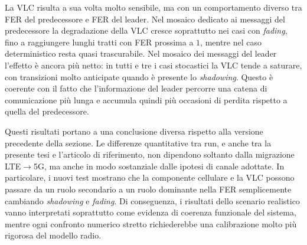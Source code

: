 La VLC risulta a sua volta molto sensibile, ma con un comportamento diverso tra FER del predecessore e FER del leader. Nel mosaico dedicato ai messaggi del predecessore la degradazione della VLC cresce soprattutto nei casi con \emph{fading}, fino a raggiungere lunghi tratti con FER prossima a \(1\), mentre nel caso deterministico resta quasi trascurabile. Nel mosaico dei messaggi del leader l'effetto è ancora più netto: in tutti e tre i casi stocastici la VLC tende a saturare, con transizioni molto anticipate quando è presente lo \emph{shadowing}. Questo è coerente con il fatto che l'informazione del leader percorre una catena di comunicazione più lunga e accumula quindi più occasioni di perdita rispetto a quella del predecessore.

Questi risultati portano a una conclusione diversa rispetto alla versione precedente della sezione. Le differenze quantitative tra run, e anche tra la presente tesi e l'articolo di riferimento, non dipendono soltanto dalla migrazione LTE\(\rightarrow\)5G, ma anche in modo sostanziale dalle ipotesi di canale adottate. In particolare, i nuovi test mostrano che la componente cellulare e la VLC possono passare da un ruolo secondario a un ruolo dominante nella FER semplicemente cambiando \emph{shadowing} e \emph{fading}. Di conseguenza, i risultati dello scenario realistico vanno interpretati soprattutto come evidenza di coerenza funzionale del sistema, mentre ogni confronto numerico stretto richiederebbe una calibrazione molto più rigorosa del modello radio.
